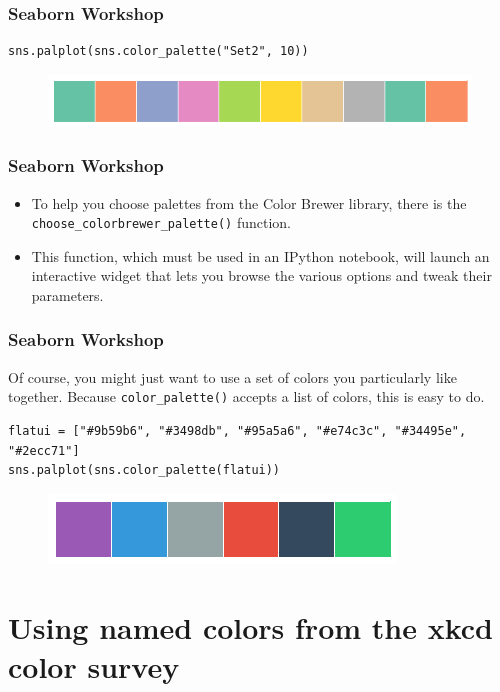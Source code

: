 \documentclass{beamer}
\begin{document}
\begin{frame}[fragile]
	\frametitle{Seaborn Workshop}
	\large
\begin{verbatim}
sns.palplot(sns.color_palette("Set2", 10))
\end{verbatim}
\begin{figure}
\centering
\includegraphics[width=0.7\linewidth]{images/color_palettes_17_0}
\caption{}
\label{fig:color_palettes_17_0}
\end{figure}
\end{frame}
\begin{frame}[fragile]
	\frametitle{Seaborn Workshop}
	\large
	\begin{itemize}
\item To help you choose palettes from the Color Brewer library, there is the \texttt{choose\_colorbrewer\_palette()} function.
\item This function, which must be used in an IPython notebook, will launch an interactive widget that lets you browse the various options and tweak their parameters.
	\end{itemize}

\end{frame}
\begin{frame}[fragile]
\frametitle{Seaborn Workshop}
\large

Of course, you might just want to use a set of colors you particularly like together. Because \texttt{color\_palette()} accepts a list of colors, this is easy to do.
\begin{verbatim}
flatui = ["#9b59b6", "#3498db", "#95a5a6", "#e74c3c", "#34495e", "#2ecc71"]
sns.palplot(sns.color_palette(flatui))
\end{verbatim}
\begin{figure}
	\centering
	\includegraphics[width=0.7\linewidth]{images/color_palettes_19_0}
\end{figure}
\end{frame}
\section{Using named colors from the xkcd color survey}
	
\end{document}
